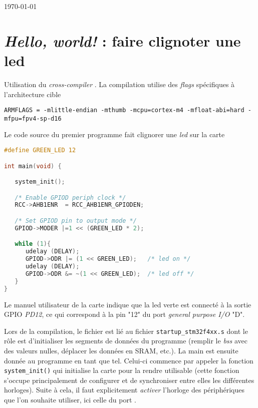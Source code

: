 \documentclass{FicheLecture}
\begin{document}
{\raggedright\sffamily\bfseries\LARGE\textcolor{RoyalBlue}{\GetTitre}\par}
{\raggedright\sffamily\bfseries\large {\GetSousTitre} \par}
\vskip 20pt
{\raggedright\sffamily\large{\GetAuteur}\par}
{\raggedright\sffamily\large{\today}}
\vskip 40pt

\tableofcontents

\AddEntetesPiedsDePage


\section{\emph{Hello, world!} : faire clignoter une led}

Utilisation du \emph{cross-compiler} .
La compilation utilise des \emph{flags} spécifiques à l'architecture cible 

\begin{lstlisting} 
ARMFLAGS = -mlittle-endian -mthumb -mcpu=cortex-m4 -mfloat-abi=hard -mfpu=fpv4-sp-d16 
\end{lstlisting}

Le code source du premier programme fait clignorer une \emph{led} sur la carte

\begin{lstlisting}[language=C]
#define GREEN_LED 12

int main(void) {

   system_init();

   /* Enable GPIOD periph clock */
   RCC->AHB1ENR  = RCC_AHB1ENR_GPIODEN;

   /* Set GPIOD pin to output mode */
   GPIOD->MODER |=1 << (GREEN_LED * 2);

   while (1){
      udelay (DELAY);
      GPIOD->ODR |= (1 << GREEN_LED);   /* led on */
      udelay (DELAY);
      GPIOD->ODR &= ~(1 << GREEN_LED);  /* led off */
   }
}

\end{lstlisting}

Le manuel utilisateur \cite{user:manual} de la carte indique que la led verte est connecté à la sortie GPIO \emph{PD12}, ce qui correspond à la pin "12" du port \emph{general purpose I/O} "D".

Lors de la compilation, le fichier est lié au fichier \texttt{startup\_stm32f4xx.s} dont le rôle est d'initialiser les segments de données du programme (remplir le \emph{bss} avec des valeurs nulles, déplacer les données en SRAM, etc.). La main est ensuite donnée au programme en tant que tel. Celui-ci commence par appeler la fonction \texttt{system\_init()} qui initialise la carte pour la rendre utilisable (cette fonction s'occupe principalement de configurer et de synchroniser entre elles les différentes horloges). Suite à cela, il faut explicitement \emph{activer} l'horloge des périphériques que l'on souhaite utiliser, ici celle du port . 
\end{document}
